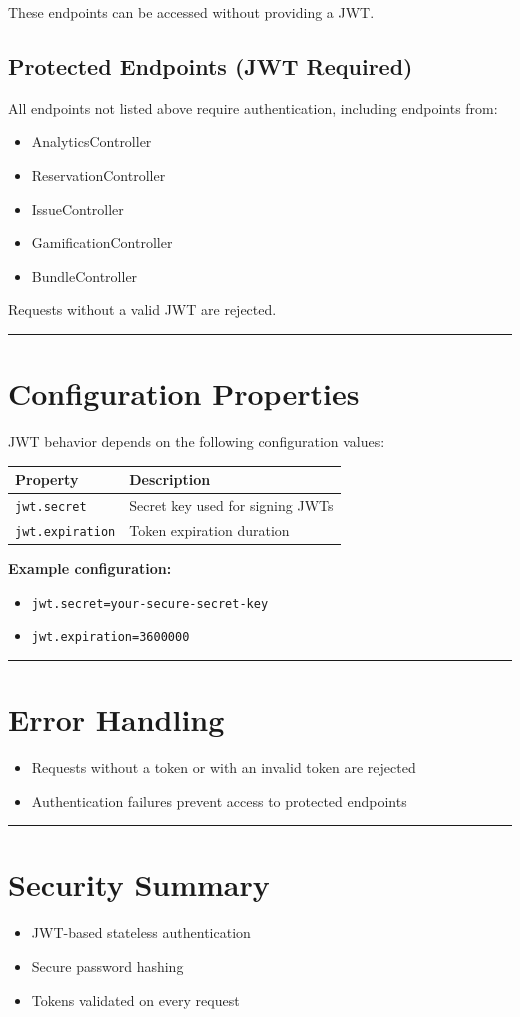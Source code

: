 \documentclass[a4paper,11pt]{article}
\begin{document}
These endpoints can be accessed without providing a JWT.

\subsection{Protected Endpoints (JWT Required)}

All endpoints not listed above require authentication, including endpoints from:
\begin{itemize}
  \item AnalyticsController
  \item ReservationController
  \item IssueController
  \item GamificationController
  \item BundleController
\end{itemize}

Requests without a valid JWT are rejected.

\hrule
\vspace{1em}

\section{Configuration Properties}

JWT behavior depends on the following configuration values:

\begin{longtable}{|p{4cm}|p{8cm}|}
\hline
\textbf{Property} & \textbf{Description} \\
\hline
\texttt{jwt.secret} & Secret key used for signing JWTs \\
\texttt{jwt.expiration} & Token expiration duration \\
\hline
\end{longtable}

\textbf{Example configuration:}
\begin{itemize}
  \item \texttt{jwt.secret=your-secure-secret-key}
  \item \texttt{jwt.expiration=3600000}
\end{itemize}

\hrule
\vspace{1em}

\section{Error Handling}

\begin{itemize}
  \item Requests without a token or with an invalid token are rejected
  \item Authentication failures prevent access to protected endpoints
\end{itemize}

\hrule
\vspace{1em}

\section{Security Summary}

\begin{itemize}
  \item JWT-based stateless authentication
  \item Secure password hashing
  \item Tokens validated on every request
\end{itemize}
\end{document}
